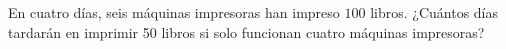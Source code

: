 En cuatro días, seis máquinas impresoras han impreso $100$ libros. ¿Cuántos días tardarán en imprimir 50 libros si solo funcionan cuatro máquinas impresoras?